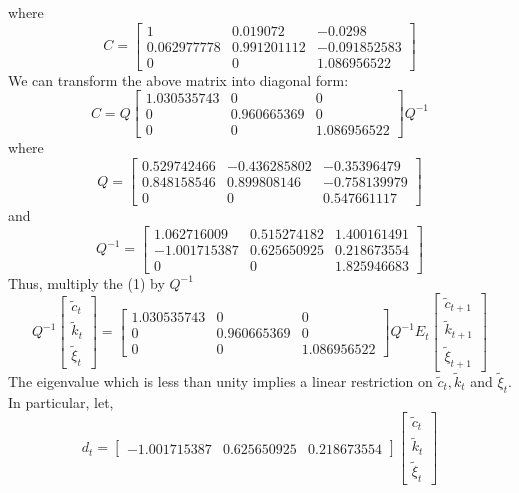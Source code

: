 \documentclass{article}
\begin{document}
where
$$C=\left[\begin{array}{ccc} 1 & 0.019072 & -0.0298 \\
0.062977778 & 0.991201112 & -0.091852583 \\
0 & 0 & 1.086956522 \end{array}\right]$$
We can transform the above matrix into diagonal form:
$$C=Q \left[\begin{array}{ccc} 1.030535743 & 0 & 0 \\ 0 & 0.960665369 & 0 \\
0 & 0 & 1.086956522 \end{array}\right] Q^{-1}$$
where
$$Q=\left[\begin{array}{ccc} 0.529742466 & -0.436285802 & -0.35396479 \\ 0.848158546 & 0.899808146 & -0.758139979 \\
0 & 0 & 0.547661117 \end{array}\right]$$
and
$$Q^{-1}=\left[\begin{array}{ccc} 1.062716009 & 0.515274182 & 1.400161491 \\
-1.001715387 & 0.625650925 & 0.218673554 \\ 0 & 0 & 1.825946683 \end{array}\right]$$
Thus, multiply the (1) by $Q^{-1}$
$$Q^{-1} \left[\begin{array}{c} \tilde c_{t} \\ \tilde k_{t} \\ \tilde \xi_{t} \end{array}\right] = \left[\begin{array}{ccc} 1.030535743 & 0 & 0 \\ 0 & 0.960665369 & 0 \\ 0 & 0 & 1.086956522 \end{array}\right] Q^{-1}E_t \left[\begin{array}{c} \tilde c_{t+1} \\ \tilde k_{t+1} \\ \tilde \xi_{t+1} \end{array}\right]$$
The eigenvalue which is less than unity implies a linear restriction on $\tilde c_t, \tilde k_t$ and $\tilde \xi_t$. In particular, let,
$$d_t=\left[\begin{array}{ccc} -1.001715387 & 0.625650925 & 0.218673554 \end{array}\right] \left[\begin{array}{c} \tilde c_{t} \\ \tilde k_{t} \\ \tilde \xi_{t} \end{array}\right]$$
\end{document}

